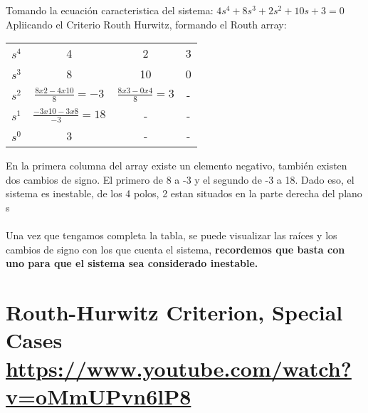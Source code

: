 \documentclass[
	12pt, %
]{fphw}
\begin{document}
Tomando la ecuación caracteristica del sistema: $4s^{4}+8s^{3}+2s^{2}+10s+3=0$\\
Apliicando el Criterio Routh Hurwitz, formando el Routh array:
\begin{center}
\begin{tabular}{c c c c}
$s^{4}$ & 4 & 2 & 3 \\
$s^{3}$ & 8 & 10 & 0 \\
$s^{2}$ & $\frac{8x2-4x10}{8}=-3$ & $\frac{8x3-0x4}{8}=3$ & - \\
$s^{1}$ & $\frac{-3x10-3x8}{-3}=18$ & - & - \\
$s^{0}$ & 3 & - & - 
\end{tabular}  
\end{center}
En la primera columna del array existe un elemento negativo, también existen dos cambios de signo. El primero de 8 a -3 y el segundo de -3 a 18. Dado eso, el sistema es inestable, de los 4 polos, 2 estan situados en la parte derecha del plano s\\\\

Una vez que tengamos completa la tabla, se puede visualizar las raíces y los cambios de signo con los que cuenta el sistema, \textbf{recordemos que basta con uno para que el sistema sea considerado inestable.} \\

\newpage
\section*{{\color{Apricot}Routh-Hurwitz Criterion, Special Cases} \url{https://www.youtube.com/watch?v=oMmUPvn6lP8}}
\end{document}
